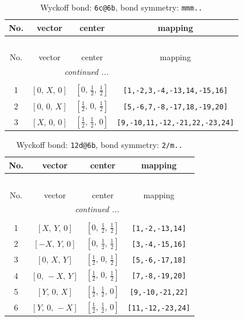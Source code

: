 \documentclass[fleqn,8pt]{jsarticle}
\begin{document}
\renewcommand{\arraystretch}{1.2}
\begin{longtable}{cccc}
\caption{Wyckoff bond: {\tt 6c@6b}, bond symmetry: {\tt mmm..}}
 \\
 \hline \hline
No. & vector & center & mapping \\ \hline \endfirsthead

\multicolumn{3}{l}{\tablename\ \thetable{}} \\
 \hline \hline
No. & vector & center & mapping \\ \hline \endhead

 \hline \hline
\multicolumn{3}{r}{\footnotesize\it continued ...} \\ \endfoot

 \hline \hline
\multicolumn{3}{r}{} \\ \endlastfoot

1 & $\left[ 0,\, X,\, 0 \right]$ & $\left[ 0,\, \frac{1}{2},\, \frac{1}{2} \right]$ & {\tt [1,-2,3,-4,-13,14,-15,16]} \\ \hline
2 & $\left[ 0,\, 0,\, X \right]$ & $\left[ \frac{1}{2},\, 0,\, \frac{1}{2} \right]$ & {\tt [5,-6,7,-8,-17,18,-19,20]} \\ \hline
3 & $\left[ X,\, 0,\, 0 \right]$ & $\left[ \frac{1}{2},\, \frac{1}{2},\, 0 \right]$ & {\tt [9,-10,11,-12,-21,22,-23,24]} \\
\end{longtable}
\renewcommand{\arraystretch}{1.2}
\begin{longtable}{cccc}
\caption{Wyckoff bond: {\tt 12d@6b}, bond symmetry: {\tt 2/m..}}
 \\
 \hline \hline
No. & vector & center & mapping \\ \hline \endfirsthead

\multicolumn{3}{l}{\tablename\ \thetable{}} \\
 \hline \hline
No. & vector & center & mapping \\ \hline \endhead

 \hline \hline
\multicolumn{3}{r}{\footnotesize\it continued ...} \\ \endfoot

 \hline \hline
\multicolumn{3}{r}{} \\ \endlastfoot

1 & $\left[ X,\, Y,\, 0 \right]$ & $\left[ 0,\, \frac{1}{2},\, \frac{1}{2} \right]$ & {\tt [1,-2,-13,14]} \\ \hline
2 & $\left[ - X,\, Y,\, 0 \right]$ & $\left[ 0,\, \frac{1}{2},\, \frac{1}{2} \right]$ & {\tt [3,-4,-15,16]} \\ \hline
3 & $\left[ 0,\, X,\, Y \right]$ & $\left[ \frac{1}{2},\, 0,\, \frac{1}{2} \right]$ & {\tt [5,-6,-17,18]} \\ \hline
4 & $\left[ 0,\, - X,\, Y \right]$ & $\left[ \frac{1}{2},\, 0,\, \frac{1}{2} \right]$ & {\tt [7,-8,-19,20]} \\ \hline
5 & $\left[ Y,\, 0,\, X \right]$ & $\left[ \frac{1}{2},\, \frac{1}{2},\, 0 \right]$ & {\tt [9,-10,-21,22]} \\ \hline
6 & $\left[ Y,\, 0,\, - X \right]$ & $\left[ \frac{1}{2},\, \frac{1}{2},\, 0 \right]$ & {\tt [11,-12,-23,24]} \\
\end{longtable}
\end{document}
